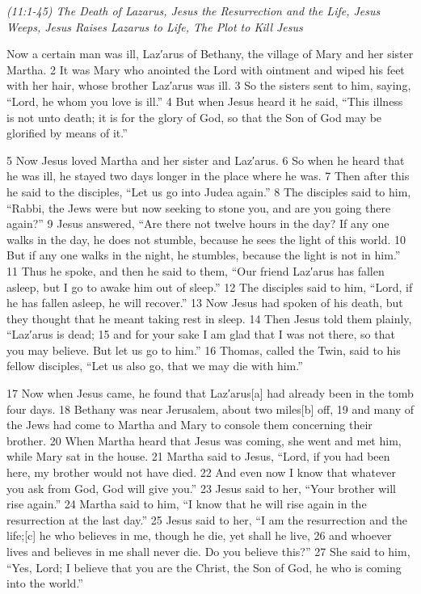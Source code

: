 \documentclass[letterpaper]{report}
\begin{document}
{\centering
	\emph{(11:1-45) The Death of Lazarus,
		Jesus the Resurrection and the Life,
		Jesus Weeps,
		Jesus Raises Lazarus to Life,
		The Plot to Kill Jesus}\\
}
\begin{multicols}{2}
Now a certain man was ill, Laz′arus of Bethany, the village of Mary and her sister Martha. 2 It was Mary who anointed the Lord with ointment and wiped his feet with her hair, whose brother Laz′arus was ill. 3 So the sisters sent to him, saying, “Lord, he whom you love is ill.” 4 But when Jesus heard it he said, “This illness is not unto death; it is for the glory of God, so that the Son of God may be glorified by means of it.”

5 Now Jesus loved Martha and her sister and Laz′arus. 6 So when he heard that he was ill, he stayed two days longer in the place where he was. 7 Then after this he said to the disciples, “Let us go into Judea again.” 8 The disciples said to him, “Rabbi, the Jews were but now seeking to stone you, and are you going there again?” 9 Jesus answered, “Are there not twelve hours in the day? If any one walks in the day, he does not stumble, because he sees the light of this world. 10 But if any one walks in the night, he stumbles, because the light is not in him.” 11 Thus he spoke, and then he said to them, “Our friend Laz′arus has fallen asleep, but I go to awake him out of sleep.” 12 The disciples said to him, “Lord, if he has fallen asleep, he will recover.” 13 Now Jesus had spoken of his death, but they thought that he meant taking rest in sleep. 14 Then Jesus told them plainly, “Laz′arus is dead; 15 and for your sake I am glad that I was not there, so that you may believe. But let us go to him.” 16 Thomas, called the Twin, said to his fellow disciples, “Let us also go, that we may die with him.”

17 Now when Jesus came, he found that Laz′arus[a] had already been in the tomb four days. 18 Bethany was near Jerusalem, about two miles[b] off, 19 and many of the Jews had come to Martha and Mary to console them concerning their brother. 20 When Martha heard that Jesus was coming, she went and met him, while Mary sat in the house. 21 Martha said to Jesus, “Lord, if you had been here, my brother would not have died. 22 And even now I know that whatever you ask from God, God will give you.” 23 Jesus said to her, “Your brother will rise again.” 24 Martha said to him, “I know that he will rise again in the resurrection at the last day.” 25 Jesus said to her, “I am the resurrection and the life;[c] he who believes in me, though he die, yet shall he live, 26 and whoever lives and believes in me shall never die. Do you believe this?” 27 She said to him, “Yes, Lord; I believe that you are the Christ, the Son of God, he who is coming into the world.”


\end{multicols}
\end{document}
